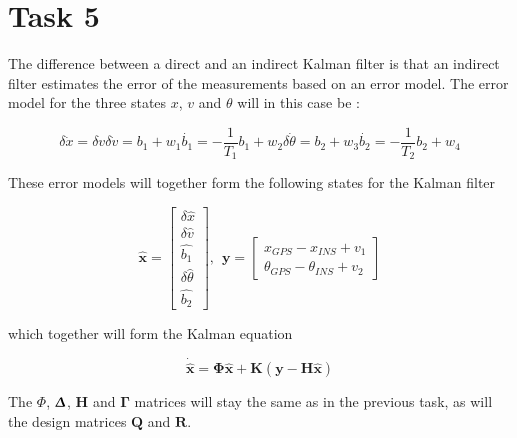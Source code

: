 \documentclass{article}
\begin{document}
\section*{Task 5}
The difference between a direct and an indirect Kalman filter is that an indirect filter estimates the error of the measurements based on an error model. The error model for the three states $x$, $v$ and $\theta$ will in this case be \cite{heftet}:

\begin{subequations}
\begin{equation}
	\delta\dot{x} = \delta v
\end{equation}
\begin{equation}
	\delta\dot{v} = b_1 + w_1
\end{equation}
\begin{equation}
	\dot{b_1} = -\frac{1}{T_1}b_1 + w_2
\end{equation}
\begin{equation}
	\delta\dot{\theta} = b_2 + w_3
\end{equation}
\begin{equation}
	\dot{b_2} = -\frac{1}{T_2}b_2 + w_4
\end{equation}
\end{subequations}

These error models will together form the following states for the Kalman filter

\begin{equation}
	\hat{\bm{x}} =
	\begin{bmatrix}
		\delta\hat{x} \\ \delta\hat{v} \\ \hat{b_1} \\ \delta\hat{\theta} \\ \hat{b_2}
	\end{bmatrix}
	, \hspace{5pt}
	\bm{y} = 
	\begin{bmatrix}
		x_{GPS} - x_{INS} + v_1 \\
		\theta_{GPS} - \theta_{INS} + v_2
	\end{bmatrix}
\end{equation}

which together will form the Kalman equation

\begin{equation}
	\dot{\hat{\bm{x}}} = \bm{\Phi}\hat{\bm{x}} + \bm{K}(\bm{y} - \bm{H}\hat{\bm{x}})
\end{equation}

The $\Phi$, $\bm{\Updelta}$, $\bm{H}$ and $\bm{\Gamma}$ matrices will stay the same as in the previous task, as will the design matrices $\bm{Q}$ and $\bm{R}$.
	
\end{document}
